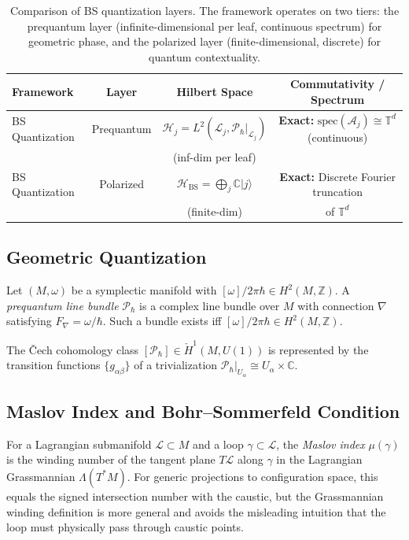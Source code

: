 \documentclass[11pt]{article}
\begin{document}
\begin{table}[h]
\centering
\begin{tabular}{|l|c|c|c|}
\hline
\textbf{Framework} & \textbf{Layer} & \textbf{Hilbert Space} & \textbf{Commutativity / Spectrum} \\
\hline
BS Quantization & Prequantum & $\mathcal{H}_j = L^2(\mathcal{L}_j, \mathcal{P}_\hbar|_{\mathcal{L}_j})$ & \textbf{Exact:} $\mathrm{spec}(\mathcal{A}_j) \cong \mathbb{T}^d$ (continuous) \\
& & (inf-dim per leaf) & \\
\hline
BS Quantization & Polarized & $\mathcal{H}_{\mathrm{BS}} = \bigoplus_j \mathbb{C}|j\rangle$ & \textbf{Exact:} Discrete Fourier truncation \\
& & (finite-dim) & of $\mathbb{T}^d$ \\
\hline
\end{tabular}
\caption{Comparison of BS quantization layers. The framework operates on two tiers:
the prequantum layer (infinite-dimensional per leaf, continuous spectrum) for geometric phase,
and the polarized layer (finite-dimensional, discrete) for quantum contextuality.}
\label{tab:comparison}
\end{table}

\subsection{Geometric Quantization}

Let $(M, \omega)$ be a symplectic manifold with $[\omega]/2\pi\hbar \in H^2(M, \mathbb{Z})$.
A \emph{prequantum line bundle} $\mathcal{P}_\hbar$ is a complex line bundle
over $M$ with connection $\nabla$ satisfying $F_\nabla = \omega/\hbar$.
Such a bundle exists iff $[\omega]/2\pi\hbar \in H^2(M, \mathbb{Z})$.

The Čech cohomology class $[\mathcal{P}_\hbar] \in \check{H}^1(M, U(1))$
is represented by the transition functions $\{g_{\alpha\beta}\}$ of a
trivialization $\mathcal{P}_\hbar|_{U_\alpha} \cong U_\alpha \times \mathbb{C}$.

\subsection{Maslov Index and Bohr--Sommerfeld Condition}

For a Lagrangian submanifold $\mathcal{L} \subset M$ and a loop
$\gamma \subset \mathcal{L}$, the \emph{Maslov index} $\mu(\gamma)$ is
the winding number of the tangent plane $T\mathcal{L}$ along $\gamma$ in
the Lagrangian Grassmannian $\Lambda(T^*M)$. For generic projections to
configuration space, this equals the signed intersection number with the
caustic, but the Grassmannian winding definition is more general and
avoids the misleading intuition that the loop must physically pass
through caustic points.
\end{document}
